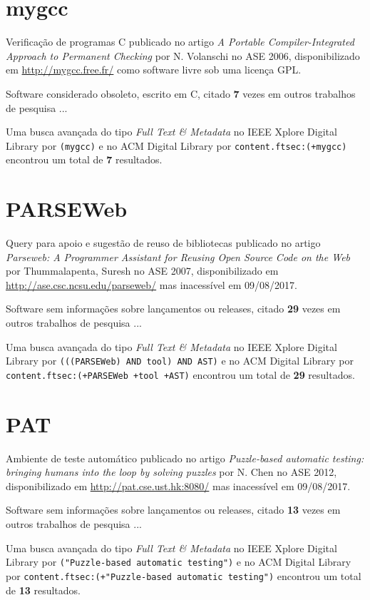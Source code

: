 \section{mygcc}

Verificação de programas C
publicado no artigo {\it A Portable Compiler-Integrated Approach to Permanent Checking}
por N. Volanschi
no ASE 2006,
disponibilizado em \url{http://mygcc.free.fr/}
como software livre
sob uma licença GPL.

Software considerado obsoleto,
escrito em C,
citado {\bf 7} vezes em outros trabalhos de pesquisa ...

Uma busca avançada do tipo {\it Full Text \& Metadata} no IEEE Xplore Digital Library por
\texttt{(mygcc)}
e no ACM Digital Library por
\texttt{content.ftsec:(+mygcc)}
encontrou um total de
{\bf 7}
resultados.

\section{PARSEWeb}

Query para apoio e sugestão de reuso de bibliotecas
publicado no artigo {\it Parseweb: A Programmer Assistant for Reusing Open Source Code on the Web}
por Thummalapenta, Suresh
no ASE 2007,
disponibilizado em \url{http://ase.csc.ncsu.edu/parseweb/}
mas inacessível em 09/08/2017.

Software sem informações sobre lançamentos ou releases,
citado {\bf 29} vezes em outros trabalhos de pesquisa ...

Uma busca avançada do tipo {\it Full Text \& Metadata} no IEEE Xplore Digital Library por
\texttt{(((PARSEWeb) AND tool) AND AST)}
e no ACM Digital Library por
\texttt{content.ftsec:(+PARSEWeb +tool +AST)}
encontrou um total de
{\bf 29}
resultados.

\section{PAT}

Ambiente de teste automático
publicado no artigo {\it Puzzle-based automatic testing: bringing humans into the loop by solving puzzles}
por N. Chen
no ASE 2012,
disponibilizado em \url{http://pat.cse.ust.hk:8080/}
mas inacessível em 09/08/2017.

Software sem informações sobre lançamentos ou releases,
citado {\bf 13} vezes em outros trabalhos de pesquisa ...

Uma busca avançada do tipo {\it Full Text \& Metadata} no IEEE Xplore Digital Library por
\texttt{("Puzzle-based automatic testing")}
e no ACM Digital Library por
\texttt{content.ftsec:(+"Puzzle-based automatic testing")}
encontrou um total de
{\bf 13}
resultados.


